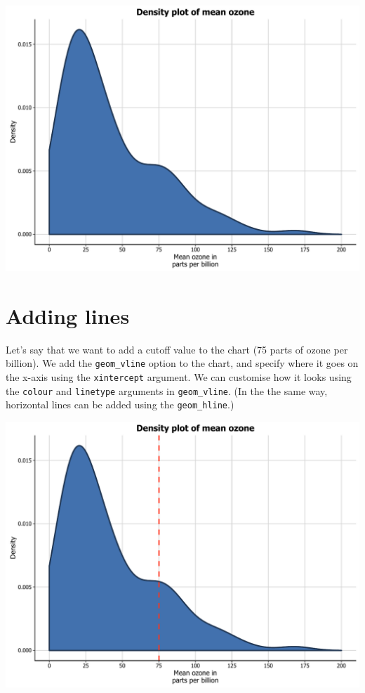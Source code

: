 \begin{center}\includegraphics[width=0.55\linewidth]{figures/density_12-1} \end{center}

\section{Adding lines}\label{adding-lines-1}

Let's say that we want to add a cutoff value to the chart (75 parts of
ozone per billion). We add the \texttt{geom\_vline} option to the chart,
and specify where it goes on the x-axis using the \texttt{xintercept}
argument. We can customise how it looks using the \texttt{colour} and
\texttt{linetype} arguments in \texttt{geom\_vline}. (In the the same
way, horizontal lines can be added using the \texttt{geom\_hline}.)

\begin{Shaded}
\begin{Highlighting}[]

\StringTok{ }\StringTok{ }\NormalTok{(} \NormalTok{, } \NormalTok{, } \NormalTok{, }
\StringTok{        } \NormalTok{)}
\end{Highlighting}
\end{Shaded}

\begin{center}\includegraphics[width=0.55\linewidth]{figures/density_13-1} \end{center}

